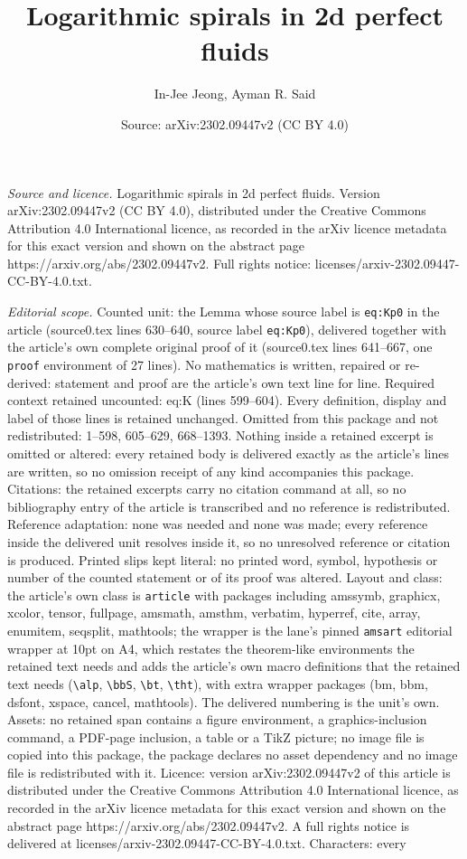 \documentclass[10pt,a4paper]{amsart}
\title[Logarithmic spirals in 2d perfect fluids]{Logarithmic spirals in 2d perfect fluids}
\author{In-Jee Jeong, Ayman R. Said}
\date{Source: arXiv:2302.09447v2 (CC BY 4.0)}
\begin{document}
\maketitle

\noindent\emph{Source and licence.} Logarithmic spirals in 2d perfect fluids. Version arXiv:2302.09447v2 (CC BY 4.0), distributed under the Creative Commons Attribution 4.0 International licence, as recorded in the arXiv licence metadata for this exact version and shown on the abstract page https://arxiv.org/abs/2302.09447v2. Full rights notice: licenses/arxiv-2302.09447-CC-BY-4.0.txt.\par\smallskip

\noindent\textit{Editorial scope.} Counted unit: the Lemma whose source label is \texttt{eq:Kp0} in the article (source0.tex lines 630--640, source label \texttt{eq:Kp0}), delivered together with the article's own complete original proof of it (source0.tex lines 641--667, one \texttt{proof} environment of 27 lines). No mathematics is written, repaired or re-derived: statement and proof are the article's own text line for line. Required context retained uncounted: eq:K (lines 599--604). Every definition, display and label of those lines is retained unchanged. Omitted from this package and not redistributed: 1--598, 605--629, 668--1393. Nothing inside a retained excerpt is omitted or altered: every retained body is delivered exactly as the article's lines are written, so no omission receipt of any kind accompanies this package. Citations: the retained excerpts carry no citation command at all, so no bibliography entry of the article is transcribed and no reference is redistributed. Reference adaptation: none was needed and none was made; every reference inside the delivered unit resolves inside it, so no unresolved reference or citation is produced. Printed slips kept literal: no printed word, symbol, hypothesis or number of the counted statement or of its proof was altered. Layout and class: the article's own class is \texttt{article} with packages including amssymb, graphicx, xcolor, tensor, fullpage, amsmath, amsthm, verbatim, hyperref, cite, array, enumitem, seqsplit, mathtools; the wrapper is the lane's pinned \texttt{amsart} editorial wrapper at 10pt on A4, which restates the theorem-like environments the retained text needs and adds the article's own macro definitions that the retained text needs (\texttt{\textbackslash alp}, \texttt{\textbackslash bbS}, \texttt{\textbackslash bt}, \texttt{\textbackslash tht}), with extra wrapper packages (bm, bbm, dsfont, xspace, cancel, mathtools). The delivered numbering is the unit's own. Assets: no retained span contains a figure environment, a graphics-inclusion command, a PDF-page inclusion, a table or a TikZ picture; no image file is copied into this package, the package declares no asset dependency and no image file is redistributed with it. Licence: version arXiv:2302.09447v2 of this article is distributed under the Creative Commons Attribution 4.0 International licence, as recorded in the arXiv licence metadata for this exact version and shown on the abstract page https://arxiv.org/abs/2302.09447v2. A full rights notice is delivered at licenses/arxiv-2302.09447-CC-BY-4.0.txt. Characters: every 
\end{document}
